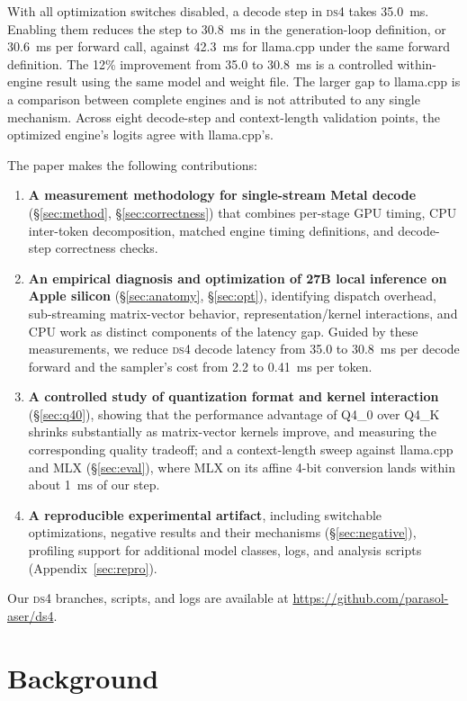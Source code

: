 \documentclass[11pt]{article}
\newcommand{\ds}{\textsc{ds4}}
\newcommand{\branchurl}{\url{https://github.com/parasol-aser/ds4}}
\begin{document}
With all optimization switches disabled, a decode step in \ds{} takes
35.0~ms. Enabling them reduces the step to 30.8~ms in the generation-loop
definition, or 30.6~ms per forward call, against 42.3~ms for llama.cpp
under the same forward definition. The 12\% improvement from 35.0 to
30.8~ms is a controlled within-engine result using the same model and
weight file. The larger gap to llama.cpp is a comparison between complete
engines and is not attributed to any single mechanism. Across eight
decode-step and context-length validation points, the optimized engine's
logits agree with llama.cpp's.

The paper makes the following contributions:
\begin{enumerate}
\item \textbf{A measurement methodology for single-stream Metal decode}
  (\S\ref{sec:method}, \S\ref{sec:correctness}) that combines per-stage GPU
  timing, CPU inter-token decomposition, matched engine timing definitions,
  and decode-step correctness checks.
\item \textbf{An empirical diagnosis and optimization of 27B local
  inference on Apple silicon} (\S\ref{sec:anatomy}, \S\ref{sec:opt}),
  identifying dispatch overhead, sub-streaming matrix-vector behavior,
  representation/kernel interactions, and CPU work as distinct components
  of the latency gap. Guided by these measurements, we reduce \ds{} decode
  latency from 35.0 to 30.8~ms per decode forward and the sampler's cost
  from 2.2 to 0.41~ms per token.
\item \textbf{A controlled study of quantization format and kernel
  interaction} (\S\ref{sec:q40}), showing that the performance advantage of
  Q4\_0 over Q4\_K shrinks substantially as matrix-vector kernels improve,
  and measuring the corresponding quality tradeoff; and a context-length
  sweep against llama.cpp and MLX (\S\ref{sec:eval}), where MLX on its
  affine 4-bit conversion lands within about 1~ms of our step.
\item \textbf{A reproducible experimental artifact}, including switchable
  optimizations, negative results and their mechanisms
  (\S\ref{sec:negative}), profiling support for additional model classes,
  logs, and analysis scripts (Appendix~\ref{sec:repro}).
\end{enumerate}

Our \ds{} branches, scripts, and logs are available at \branchurl{}.

\section{Background}
\label{sec:background}
\end{document}
